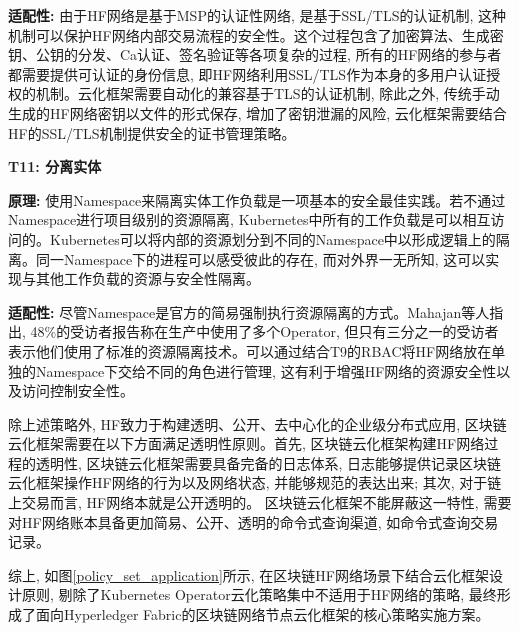\textbf{适配性: }由于HF网络是基于MSP的认证性网络, 是基于SSL/TLS的认证机制, 这种机制可以保护HF网络内部交易流程的安全性。这个过程包含了加密算法、生成密钥、公钥的分发、Ca认证、签名验证等各项复杂的过程, 所有的HF网络的参与者都需要提供可认证的身份信息, 即HF网络利用SSL/TLS作为本身的多用户认证授权的机制。云化框架需要自动化的兼容基于TLS的认证机制, 除此之外, 传统手动生成的HF网络密钥以文件的形式保存, 增加了密钥泄漏的风险, 云化框架需要结合HF的SSL/TLS机制提供安全的证书管理策略。


\textbf{T11: 分离实体}

\textbf{原理: }使用Namespace来隔离实体工作负载是一项基本的安全最佳实践。若不通过Namespace进行项目级别的资源隔离, Kubernetes中所有的工作负载是可以相互访问的。Kubernetes可以将内部的资源划分到不同的Namespace中以形成逻辑上的隔离。同一Namespace下的进程可以感受彼此的存在, 而对外界一无所知, 这可以实现与其他工作负载的资源与安全性隔离。

\textbf{适配性: }尽管Namespace是官方的简易强制执行资源隔离的方式。Mahajan等人\cite{mahajan2020suture}指出, 48\%的受访者报告称在生产中使用了多个Operator, 但只有三分之一的受访者表示他们使用了标准的资源隔离技术。可以通过结合T9的RBAC将HF网络放在单独的Namespace下交给不同的角色进行管理, 这有利于增强HF网络的资源安全性以及访问控制安全性。

除上述策略外, HF致力于构建透明、公开、去中心化的企业级分布式应用, 区块链云化框架需要在以下方面满足透明性原则。首先, 区块链云化框架构建HF网络过程的透明性, 区块链云化框架需要具备完备的日志体系, 日志能够提供记录区块链云化框架操作HF网络的行为以及网络状态, 并能够规范的表达出来; 其次, 对于链上交易而言, HF网络本就是公开透明的。 区块链云化框架不能屏蔽这一特性, 需要对HF网络账本具备更加简易、公开、透明的命令式查询渠道, 如命令式查询交易记录。

综上, 如图\ref{policy_set_application}所示, 在区块链HF网络场景下结合云化框架设计原则, 剔除了Kubernetes Operator云化策略集中不适用于HF网络的策略, 最终形成了面向Hyperledger Fabric的区块链网络节点云化框架的核心策略实施方案。


